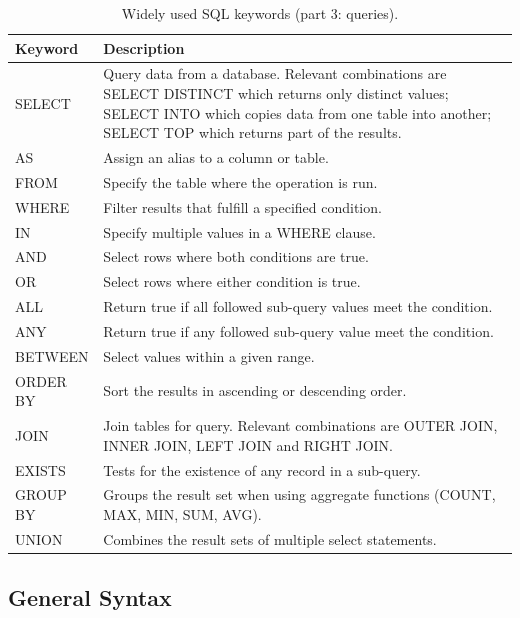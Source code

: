 \begin{table}
	\centering \caption{Widely used SQL keywords (part 3: queries).}\label{ch:db:tab:sqlkeywords3}
	\begin{tabularx}{\textwidth}{lX}
		\hline
		Keyword & Description \\ \hline
		SELECT & Query data from a database. Relevant combinations are SELECT DISTINCT which returns only distinct values; SELECT INTO which copies data from one table into another; SELECT TOP which returns part of the results. \\ \hdashline
		AS & Assign an alias to a column or table. \\ \hdashline
		FROM & Specify the table where the operation is run. \\ \hdashline
		WHERE & Filter results that fulfill a specified condition. \\ \hdashline
		IN & Specify multiple values in a WHERE clause. \\ \hdashline
		AND & Select rows where both conditions are true. \\ \hdashline
		OR & Select rows where either condition is true. \\ \hdashline
		ALL & Return true if all followed sub-query values meet the condition. \\ \hdashline
		ANY & Return true if any followed sub-query value meet the condition. \\ \hdashline
		BETWEEN & Select values within a given range. \\ \hdashline
		ORDER BY & Sort the results in ascending or descending order. \\ \hdashline
		JOIN & Join tables for query. Relevant combinations are OUTER JOIN, INNER JOIN, LEFT JOIN and RIGHT JOIN. \\ \hdashline
		EXISTS & Tests for the existence of any record in a sub-query. \\ \hdashline
		GROUP BY & Groups the result set when using aggregate functions (COUNT, MAX, MIN, SUM, AVG). \\ \hdashline
		UNION & Combines the result sets of multiple select statements. \\
		 \hline
	\end{tabularx}
\end{table}

\subsection{General Syntax}

